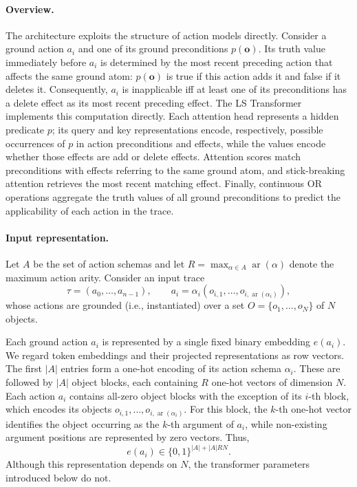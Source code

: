 \paragraph{Overview.}
The architecture exploits the structure of \strips action models directly.
Consider a ground action $a_i$ and one of its ground preconditions $p(\mathbf{o})$.
Its truth value immediately before $a_i$ is determined by the most recent preceding action that affects the same ground atom: $p(\mathbf{o})$ is true if this action adds it and false if it deletes it.
Consequently, $a_i$ is inapplicable iff at least one of its preconditions has a delete effect as its most recent preceding effect.
The LS Transformer implements this computation directly.
Each attention head represents a hidden predicate $p$; its query and key representations encode, respectively, possible occurrences of $p$ in action preconditions and effects, while the values encode whether those effects are add or delete effects.
Attention scores match preconditions with effects referring to the same ground atom, and stick-breaking attention retrieves the most recent matching effect.
Finally, continuous OR operations aggregate the truth values of all ground preconditions to predict the applicability of each action in the trace.

\paragraph{Input representation.}
Let $A$ be the set of action schemas and let $R = \max_{\alpha \in A} \operatorname{ar}(\alpha)$ denote the maximum action arity.
Consider an input trace
\begin{equation}
\tau = (a_0,\ldots,a_{n-1}),
\qquad
a_i = \alpha_i(o_{i,1},\ldots,o_{i,\operatorname{ar}(\alpha_i)}),
\end{equation}
whose actions are grounded (i.e., instantiated) over a set $O=\{o_1,\ldots,o_N\}$ of $N$ objects.

Each ground action $a_i$ is represented by a single fixed binary embedding
$e(a_i)$. We regard token embeddings and their projected representations as row
vectors.
The first $|A|$ entries form a one-hot encoding of its action schema $\alpha_i$.
These are followed by $|A|$ object blocks, each containing $R$ one-hot vectors of dimension $N$.
Each action $a_i$ contains all-zero object blocks with the exception of its $i$-th block,
which encodes its objects $o_{i,1},\ldots,o_{i,\operatorname{ar}(\alpha_i)}$.
For this block, the $k$-th one-hot vector identifies the object occurring as the $k$-th argument of $a_i$, while non-existing argument positions are represented by zero vectors.
Thus,
\begin{equation}
e(a_i) \in \{0,1\}^{|A|+|A|RN}.
\end{equation}
Although this representation depends on $N$, the transformer parameters introduced below do not.

